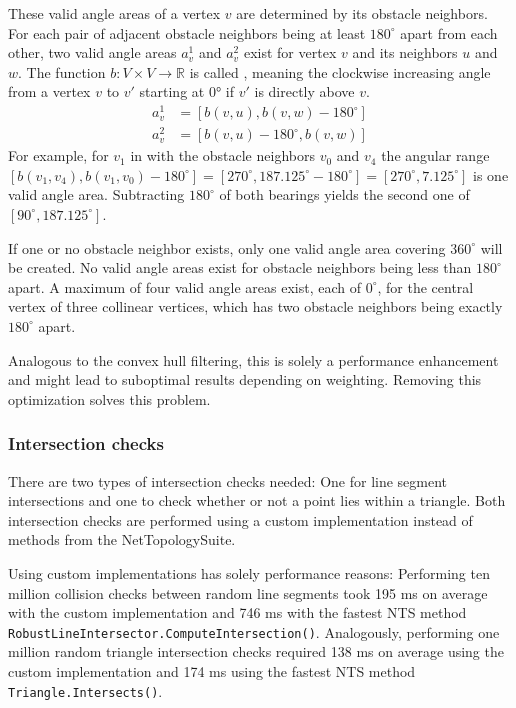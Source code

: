 			These valid angle areas of a vertex $v$ are determined by its obstacle neighbors.
			For each pair of adjacent obstacle neighbors being at least $180^\circ$ apart from each other, two valid angle areas $a_v^1$ and $a_v^2$ exist for vertex $v$ and its neighbors $u$ and $w$.
			The function $b: V \times V \rightarrow \mathbb{R}$ is called , meaning the clockwise increasing angle from a vertex $v$ to $v'$ starting at 0° if $v'$ is directly above $v$.
			\begin{align*}
				a_v^1 &= [b(v, u), b(v, w) - 180^\circ] \\
				a_v^2 &= [b(v, u) - 180^\circ, b(v, w)]
			\end{align*}
			For example, for $v_1$ in  with the obstacle neighbors $v_0$ and $v_4$ the angular range $[b(v_1, v_4), b(v_1, v_0) - 180^\circ] = [270^\circ, 187.125^\circ - 180^\circ] = [270^\circ, 7.125^\circ]$ is one valid angle area.
			Subtracting $180^\circ$ of both bearings yields the second one of $[90^\circ, 187.125^\circ]$.
			
			If one or no obstacle neighbor exists, only one valid angle area covering $360^\circ$ will be created.
			No valid angle areas exist for obstacle neighbors being less than $180^\circ$ apart.
			A maximum of four valid angle areas exist, each of $0^\circ$, for the central vertex of three collinear vertices, which has two obstacle neighbors being exactly $180^\circ$ apart.
			
			Analogous to the convex hull filtering, this is solely a performance enhancement and might lead to suboptimal results depending on weighting.
			Removing this optimization solves this problem.
			
		\subsubsection{Intersection checks}
		\label{subsubsec:intersection-checks}
			
			There are two types of intersection checks needed:
			One for line segment intersections and one to check whether or not a point lies within a triangle.
			Both intersection checks are performed using a custom implementation instead of methods from the NetTopologySuite.
			
			Using custom implementations has solely performance reasons:
			Performing ten million collision checks between random line segments took 195 ms on average with the custom implementation and 746 ms with the fastest NTS method \texttt{RobustLineIntersector.ComputeIntersection()}.
			Analogously, performing one million random triangle intersection checks required 138 ms on average using the custom implementation and 174 ms using the fastest NTS method \texttt{Triangle.Intersects()}.
			
